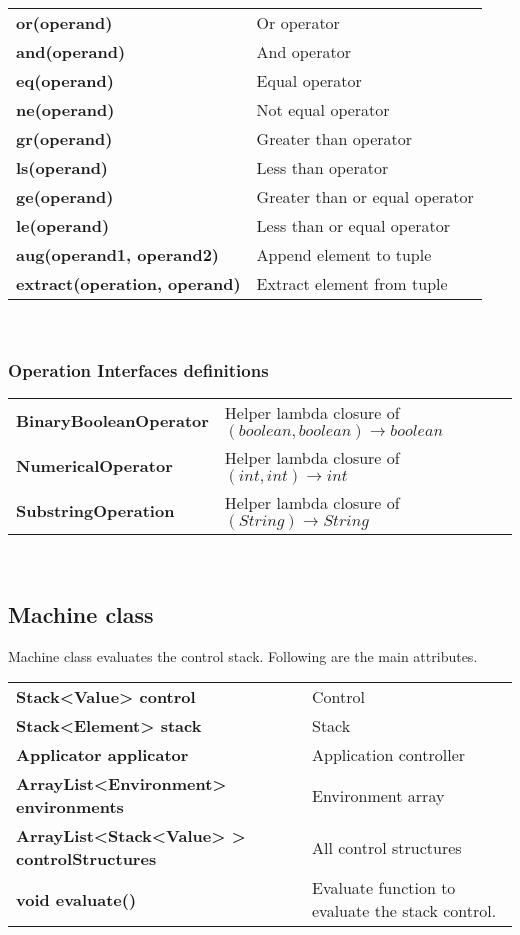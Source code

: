 \documentclass[12pt,a4paper]{article}
\begin{document}
\begin{tabular}{lp{6cm}}
        \textbf{or(operand)} & Or operator \\
        \textbf{and(operand)} & And operator \\
        \textbf{eq(operand)} & Equal operator \\
        \textbf{ne(operand)} & Not equal operator \\
        \textbf{gr(operand)} & Greater than operator \\
        \textbf{ls(operand)} & Less than operator \\
        \textbf{ge(operand)} & Greater than or equal operator \\
        \textbf{le(operand)} & Less than or equal operator \\
        \textbf{aug(operand1, operand2)} & Append element to tuple \\
        \textbf{extract(operation, operand)} & Extract element from tuple \\
    \end{tabular}\\

\subsubsection{Operation Interfaces definitions}

    \begin{tabular}{ll}
        \textbf{BinaryBooleanOperator} & Helper lambda closure of $(boolean, boolean) \rightarrow boolean$ \\
        \textbf{NumericalOperator} & Helper lambda closure of $(int, int) \rightarrow int$ \\
        \textbf{SubstringOperation} & Helper lambda closure of $(String) \rightarrow String$ \\
    \end{tabular}\\

\subsection{Machine class}

Machine class evaluates the control stack. Following are the main attributes.

\begin{tabular}{ll}
        \textbf{Stack<Value> control} & Control \\
        \textbf{Stack<Element> stack} & Stack \\
        \textbf{Applicator applicator} & Application controller \\
        \textbf{ArrayList<Environment> environments}&Environment array \\
        \textbf{ArrayList<Stack<Value> > controlStructures} & All control structures \\
        \textbf{void evaluate()} & Evaluate function to evaluate the stack control. \\
\end{tabular} \\
\end{document}
